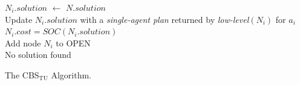\documentclass[jair,twoside,11pt,theapa]{article}
\newcommand{\cbstu}{CBS$\mathrm{_{TU}}$\xspace}
\begin{document}
\begin{algorithm}[ht]
{{        $N_i.solution$ $\leftarrow$ $N.solution$ \\
        Update $N_i.solution$ with a \emph{single-agent plan} 
         	returned by \emph{low-level}$(N_i)$ for $a_i$ \\
        $N_i.cost = SOC(N_i.solution)$\\ %
        Add node $N_i$ to OPEN \\    
    }
  }
  \Return No solution found 
  \caption{The \cbstu Algorithm.}
\label{algo.cbstu}
\end{algorithm}




\end{document}
